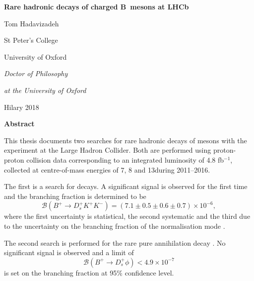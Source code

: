 

\begin{alwayssingle} 
 \thispagestyle{empty}
 \vspace*{-1in}
 \begin{center}
   { \Large {\bfseries {Rare hadronic decays of charged B~mesons at LHCb}} \par}
   {{\large \vspace*{1ex} Tom Hadavizadeh} \par}
   {\large \vspace*{1ex}
   {{St Peter's College} \par}
   {University of Oxford \par}
   \vspace*{1ex}
   {{\it \submittedtext} \par}
   {\it {Doctor of Philosophy} \par}
   {\it {at the University of Oxford} \par}
    \vspace*{2ex}
    {Hilary 2018}\par}
    \vspace*{1.5cm}
    {\Large \bfseries  Abstract}
  \end{center}

  This thesis documents two searches for rare hadronic decays of \Bp mesons with the \lhcb experiment at the Large Hadron Collider. 
  Both are performed using proton-proton collision data corresponding to an integrated luminosity of 4.8 fb$^{-1}$, collected at centre-of-mass energies of 7, 8 and 13\tev during 2011--2016.
  
  The first is a search for \decay{\Bp}{\Dsp\Kp\Km} decays. A significant signal is observed for the first time and the branching fraction is determined to be
  \begin{equation*}
  \mathcal{B}(B^{+} \to D_s^{+}K^{+}K^{-} ) = (7.1 \pm 0.5 \pm 0.6 \pm 0.7) \times 10^{-6}, 
  \end{equation*}
  \noindent where the first uncertainty is statistical, the second systematic and the third due to the uncertainty on 
  the branching fraction of the normalisation mode \decay{\Bp}{\Dsp\Dzb}.
  
  The second search is performed for the rare pure annihilation decay \decay{\Bp}{\Dsp\phiz}.
  No significant signal is observed and a limit of
  \begin{equation*}
  \mathcal{B}(B^{+} \to D_s^{+}\phi) < 4.9 \times 10^{-7}
  \end{equation*}
  is set on the branching fraction at 95\% confidence level.



\end{alwayssingle}